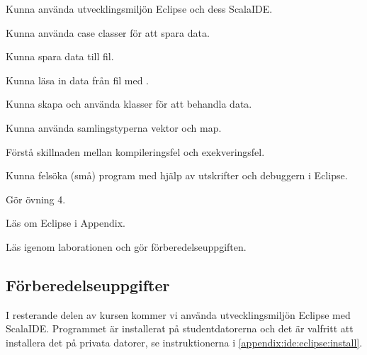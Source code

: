 


\Lab{\LabWeekFOUR}

\begin{Goals}
\item Kunna använda utvecklingsmiljön Eclipse och dess ScalaIDE.
\item Kunna använda case classer för att spara data.
\item Kunna spara data till fil.
\item Kunna l{\"a}sa in data fr{\aa}n fil med .
\item Kunna skapa och använda klasser för att behandla data.
\item Kunna använda samlingstyperna vektor och map.
\item Förstå skillnaden mellan kompileringsfel och exekveringsfel.
\item Kunna felsöka (små) program med hjälp av utskrifter och debuggern i Eclipse.

\end{Goals}

\begin{Preparations}
\item G{\"o}r {\"o}vning 4. %
\item Läs om Eclipse i Appendix.
\item Läs igenom laborationen och gör förberedelseuppgiften.
\end{Preparations}


\subsection{Förberedelseuppgifter}
I resterande delen av kursen kommer vi använda utvecklingsmiljön Eclipse med ScalaIDE. Programmet är installerat på studentdatorerna och det är valfritt att installera det på privata datorer, se instruktionerna i \ref{appendix:ide:eclipse:install}. 

